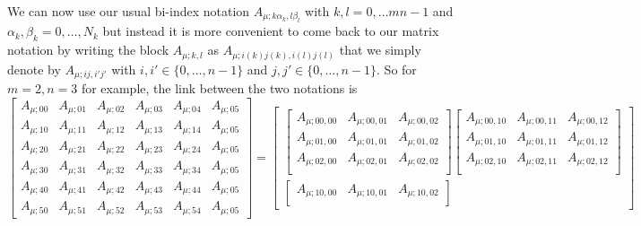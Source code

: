 \documentclass{worksheetclass}
\begin{document}
        We can now use our usual bi-index notation $A_{\mu;k\alpha_k,l\beta_l}$ with $k,l=0,\dots mn-1$ and $\alpha_k,\beta_k=0,\dots,N_k$ but instead it is more convenient to come back to our matrix notation by writing the block $A_{\mu;k,l}$ as $A_{\mu;i(k)j(k),i(l)j(l)}$ that we simply denote by $A_{\mu;ij,i'j'}$ with $i,i'\in\{0,\dots,n-1\}$ and $j,j'\in\{0,\dots,n-1\}$. So for $m=2,n=3$ for example, the link between the two notations is
        {\tiny
        \begin{equation}
            \begin{bmatrix}
                A_{\mu;00} & A_{\mu;01} & A_{\mu;02} & A_{\mu;03} & A_{\mu;04} & A_{\mu;05} \\
                A_{\mu;10} & A_{\mu;11} & A_{\mu;12} & A_{\mu;13} & A_{\mu;14} & A_{\mu;05} \\
                A_{\mu;20} & A_{\mu;21} & A_{\mu;22} & A_{\mu;23} & A_{\mu;24} & A_{\mu;05} \\
                A_{\mu;30} & A_{\mu;31} & A_{\mu;32} & A_{\mu;33} & A_{\mu;34} & A_{\mu;05} \\
                A_{\mu;40} & A_{\mu;41} & A_{\mu;42} & A_{\mu;43} & A_{\mu;44} & A_{\mu;05} \\
                A_{\mu;50} & A_{\mu;51} & A_{\mu;52} & A_{\mu;53} & A_{\mu;54} & A_{\mu;05}
            \end{bmatrix}=
            \begin{bmatrix}
                \begin{bmatrix}
                    A_{\mu;00,00} & A_{\mu;00,01} & A_{\mu;00,02}\\
                    A_{\mu;01,00} & A_{\mu;01,01} & A_{\mu;01,02}\\
                    A_{\mu;02,00} & A_{\mu;02,01} & A_{\mu;02,02}\\
                \end{bmatrix}
                \begin{bmatrix}
                    A_{\mu;00,10} & A_{\mu;00,11} & A_{\mu;00,12}\\
                    A_{\mu;01,10} & A_{\mu;01,11} & A_{\mu;01,12}\\
                    A_{\mu;02,10} & A_{\mu;02,11} & A_{\mu;02,12}\\
                \end{bmatrix}\\
                \begin{bmatrix}
                    A_{\mu;10,00} & A_{\mu;10,01} & A_{\mu;10,02}\\

\end{bmatrix}
\end{bmatrix}
\end{equation}}
\end{document}
